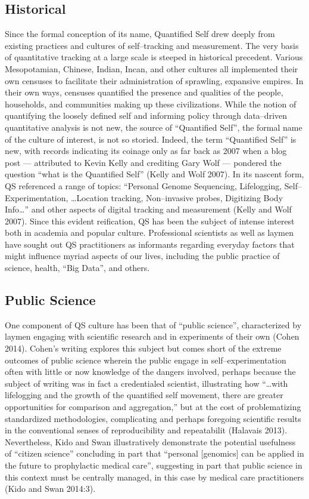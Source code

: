 \documentclass{article}
\begin{document}
\subsection*{Historical}
Since the formal conception of its name,
Quantified Self drew deeply from existing practices and cultures of self--tracking and measurement.
The very basis of quantitative tracking at a large scale is steeped in historical precedent.
Various Mesopotamian,
Chinese,
Indian,
Incan,
and other cultures all implemented their own censuses to facilitate their administration of sprawling,
expansive empires.
In their own ways,
censuses quantified the presence and qualities of the people,
households,
and communities making up these civilizations.
While the notion of quantifying the loosely defined self and informing policy through data--driven quantitative analysis is not new,
the source of ``Quantified Self'',
the formal name of the culture of interest,
is not so storied.
Indeed,
the term ``Quantified Self'' is new,
with records indicating its coinage only as far back as 2007 when a blog post
--- attributed to Kevin Kelly and crediting Gary Wolf ---
pondered the question ``what is the Quantified Self''
(Kelly and Wolf 2007).
In its nascent form,
QS referenced a range of topics:
``Personal Genome Sequencing,
Lifelogging,
Self--Experimentation,
\dots Location tracking,
Non--invasive probes,
Digitizing Body Info\dots'' and other aspects of digital tracking and measurement
(Kelly and Wolf 2007).
Since this evident reification,
QS has been the subject of intense interest both in academia and popular culture.
Professional scientists as well as laymen have sought out QS practitioners as informants regarding everyday factors that might influence myriad aspects of our lives,
including the public practice of science,
health,
``Big Data'',
and others.

\subsection*{Public Science}
One component of QS culture has been that of ``public science'',
characterized by laymen engaging with scientific research and in experiments of their own
(Cohen 2014).
Cohen's writing explores this subject but comes short of the extreme outcomes of public science wherein the public engage in self--experimentation often with little or now knowledge of the dangers involved,
perhaps because the subject of writing was in fact a credentialed scientist,
illustrating how ``\dots with lifelogging and the growth of the quantified self movement,
there are greater opportunities for comparison and aggregation,'' but at the cost of problematizing standardized methodologies,
complicating and perhaps foregoing scientific results in the conventional senses of reproducibility and repeatabilit
(Halavais 2013).
Nevertheless,
Kido and Swan illustratively demonstrate the potential usefulness of ``citizen science'' concluding in part that  ``personal [genomics] can be applied in the future to prophylactic medical care'',
suggesting in part that public science in this context must be centrally managed,
in this case by medical care practitioners
(Kido and Swan 2014:3).
\end{document}
